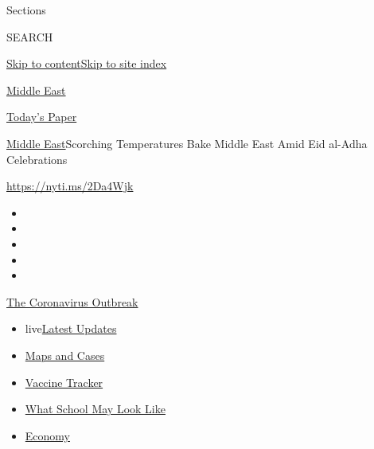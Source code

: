 Sections

SEARCH

\protect\hyperlink{site-content}{Skip to
content}\protect\hyperlink{site-index}{Skip to site index}

\href{https://www.nytimes3xbfgragh.onion/section/world/middleeast}{Middle
East}

\href{https://myaccount.nytimes3xbfgragh.onion/auth/login?response_type=cookie\&client_id=vi}{}

\href{https://www.nytimes3xbfgragh.onion/section/todayspaper}{Today's
Paper}

\href{/section/world/middleeast}{Middle East}\textbar{}Scorching
Temperatures Bake Middle East Amid Eid al-Adha Celebrations

\url{https://nyti.ms/2Da4Wjk}

\begin{itemize}
\item
\item
\item
\item
\item
\end{itemize}

\href{https://www.nytimes3xbfgragh.onion/news-event/coronavirus?action=click\&pgtype=Article\&state=default\&region=TOP_BANNER\&context=storylines_menu}{The
Coronavirus Outbreak}

\begin{itemize}
\tightlist
\item
  live\href{https://www.nytimes3xbfgragh.onion/2020/08/01/world/coronavirus-covid-19.html?action=click\&pgtype=Article\&state=default\&region=TOP_BANNER\&context=storylines_menu}{Latest
  Updates}
\item
  \href{https://www.nytimes3xbfgragh.onion/interactive/2020/us/coronavirus-us-cases.html?action=click\&pgtype=Article\&state=default\&region=TOP_BANNER\&context=storylines_menu}{Maps
  and Cases}
\item
  \href{https://www.nytimes3xbfgragh.onion/interactive/2020/science/coronavirus-vaccine-tracker.html?action=click\&pgtype=Article\&state=default\&region=TOP_BANNER\&context=storylines_menu}{Vaccine
  Tracker}
\item
  \href{https://www.nytimes3xbfgragh.onion/interactive/2020/07/29/us/schools-reopening-coronavirus.html?action=click\&pgtype=Article\&state=default\&region=TOP_BANNER\&context=storylines_menu}{What
  School May Look Like}
\item
  \href{https://www.nytimes3xbfgragh.onion/live/2020/07/31/business/stock-market-today-coronavirus?action=click\&pgtype=Article\&state=default\&region=TOP_BANNER\&context=storylines_menu}{Economy}
\end{itemize}

